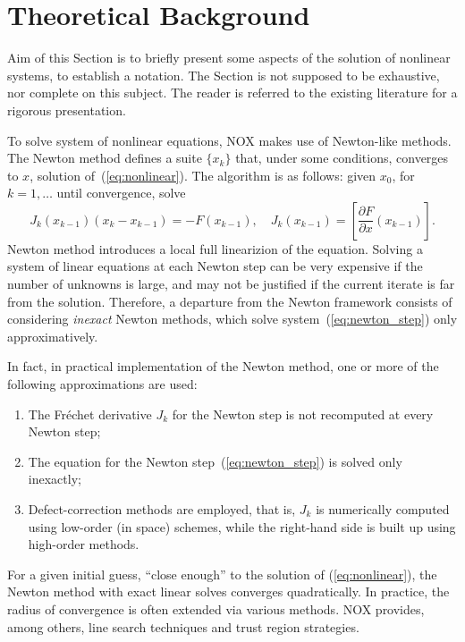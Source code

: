 
\section{Theoretical Background}
\label{sec:nox_theoretical}

Aim of this Section is to briefly present some aspects of the solution
of nonlinear systems, to establish a notation. The Section is not
supposed to be exhaustive, nor complete on this subject. The reader is
referred to the existing literature for a rigorous presentation.

\medskip

To solve system of nonlinear equations, NOX makes use of Newton-like methods.
The Newton method defines a suite $\{ x_k\}$ that, under some
conditions, converges to $x$, solution of~(\ref{eq:nonlinear}).
The algorithm is as follows: given $x_0$, for $k=1,\ldots$ until
convergence, solve
\begin{equation}
J_k  (x_{k-1})\left ( x_{k} - x_{k-1} \right) = 
- F(x_{k-1}),\quad
J_k  (x_{k-1}) =  \left[ \frac{ \partial F}{
        \partial x}( x_{k-1}) \right] .
\label{eq:newton_step}
\end{equation}
Newton method introduces a local full linearizion of the
equation. Solving a system of linear equations at each Newton step can
be very expensive if the number of unknowns is large, and may not be
justified if the current iterate is far from the solution. Therefore,
a departure from the Newton framework consists of considering {\em
inexact} Newton methods, which solve system~(\ref{eq:newton_step})
only approximatively.

In fact, in practical implementation of the Newton method, one or more
of the following approximations are used:
\begin{enumerate}
\item The Fr\'echet derivative $J_k$ for the Newton step is not
  recomputed at every Newton step;
\item The equation for the Newton step~(\ref{eq:newton_step}) is solved
  only inexactly;
\item Defect-correction methods are employed, that is, $J_k$ is
  numerically computed using low-order (in space) schemes, while the
  right-hand side is built up using high-order methods.
\end{enumerate}

For a given initial guess, ``close enough'' to the solution of
(\ref{eq:nonlinear}), the Newton method with exact linear solves
converges quadratically. In practice, the radius of convergence is often
extended via various methods. NOX provides, among others, line search
techniques and trust region strategies.

